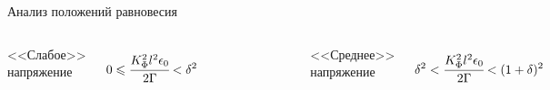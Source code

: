 \begin{frame}{Анализ положений равновесия}
\vspace{-0.9cm}
\begin{columns}
	\begin{center}
		<<Слабое>> напряжение
	\end{center}
	\vspace{-0.2cm}
	$$0 \leqslant \cfrac{K_\Phi^2 l^2 \epsilon_0}{2 \Gamma} < \delta^2$$
	\vspace{-0.7cm}
	\begin{figure}
		\includegraphics[width=\textwidth]{figures/equilibriums_case_1.png}
	\end{figure}
	\begin{center}
		<<Среднее>> напряжение
	\end{center}
	\vspace{-0.2cm}
	$$\delta^2 < \cfrac{K_\Phi^2 l^2 \epsilon_0}{2 \Gamma} < (1 + \delta)^2$$
	\vspace{-0.7cm}
	\begin{figure}
		\includegraphics[width=\textwidth]{figures/equilibriums_case_2.png}

\end{figure}
\end{columns}
\end{frame}
